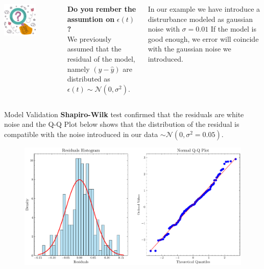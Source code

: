 \documentclass[aspectratio=169,hyperref={pdfpagelabels=false}]{beamer}
\begin{document}
\begin{frame}{}
  \begin{columns}
  \includegraphics[width=0.6\textwidth]{img/pic5.png} \centering
  
    \textbf{Do you rember the assumtion on} $\epsilon(t)$ \textbf{?} \centering \\
    \vspace{2em}
    We previously assumed that the residual of the model, namely $(y - \hat{y})$ 
    are distributed as $\epsilon(t)\sim \mathcal{N}(0,\sigma^2)$.
    \vspace{2em}

    In our example we have introduce a distrurbance modeled as gaussian noise with $\sigma = 0.01$
    If the model is good enough, we error will coincide with the gaussian noise we introduced.
  \end{columns}
\end{frame}

\begin{frame}{Model Validation}
  \textbf{Shapiro-Wilk} test confirmed that the residuals are white noise and the Q-Q Plot below shows that the distribution of the residual is compatible with the noise introduced in our data $\sim \mathcal{N}(0,\sigma^2 = 0.05)$.
  \begin{figure}
    \centering
    \includegraphics[width=0.7\linewidth]{img/residuals_analysis.pdf}
  \end{figure}
\end{frame}
\end{document}
